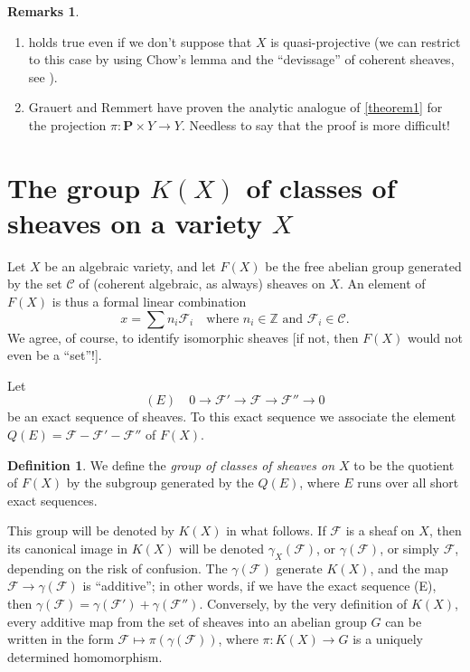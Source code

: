 \documentclass{article}
\theoremstyle{plain}
\theoremstyle{definition}
\newtheorem*{remarks}{Remarks}
\newtheorem*{definition}{Definition}
\newcommand{\sh}[1]{{\mathscr{#1}}}
\newcommand{\cat}[1]{{\mathcal{#1}}}
\newcommand{\PP}{\mathbf{P}}
\newcommand{\oldpage}[1]{\marginpar{\footnotesize$\Big\vert$ \textit{p.~#1}}}
\begin{document}
\begin{remarks}
  \begin{enumerate}
    \item {} holds true even if we don't suppose that $X$ is quasi-projective (we can restrict to this case by using Chow's lemma and the ``devissage'' of coherent sheaves, see \cite{6}).
    \item Grauert and Remmert have proven the analytic analogue of \cref{theorem1} for the projection $\pi\colon\PP\times Y\to Y$.
      Needless to say that the proof is more difficult!
  \end{enumerate}
\end{remarks}


\section{The group \texorpdfstring{$K(X)$}{K(X)} of classes of sheaves on a variety \texorpdfstring{$X$}{X}}
\label{section4}

\oldpage{105}
Let $X$ be an algebraic variety, and let $F(X)$ be the free abelian group generated by the set $\cat{C}$ of (coherent algebraic, as always) sheaves on $X$.
An element of $F(X)$ is thus a formal linear combination
\[
  x = \sum n_i\sh{F}_i
  \quad
  \mbox{where $n_i\in\mathbb{Z}$ and $\sh{F}_i\in\cat{C}$.}
\]
We agree, of course, to identify isomorphic sheaves [if not, then $F(X)$ would not even be a ``set''!].

Let
\[
  (E)\quad
  0\to\sh{F}'\to\sh{F}\to\sh{F''}\to0
\]
be an exact sequence of sheaves.
To this exact sequence we associate the element $Q(E)=\sh{F}-\sh{F}'-\sh{F}''$ of $F(X)$.

\begin{definition}
  We define the \emph{group of classes of sheaves on $X$} to be the quotient of $F(X)$ by the subgroup generated by the $Q(E)$, where $E$ runs over all short exact sequences.
\end{definition}

This group will be denoted by $K(X)$ in what follows.
If $\sh{F}$ is a sheaf on $X$, then its canonical image in $K(X)$ will be denoted $\gamma_X(\sh{F})$, or $\gamma(\sh{F})$, or simply $\sh{F}$, depending on the risk of confusion.
The $\gamma(\sh{F})$ generate $K(X)$, and the map $\sh{F}\to\gamma(\sh{F})$ is ``additive'';
in other words, if we have the exact sequence (E), then $\gamma(\sh{F})=\gamma(\sh{F}')+\gamma(\sh{F}'')$.
Conversely, by the very definition of $K(X)$, every additive map from the set of sheaves into an abelian group $G$ can be written in the form $\sh{F}\mapsto\pi(\gamma(\sh{F}))$, where $\pi\colon K(X)\to G$ is a uniquely determined homomorphism.
\end{document}
